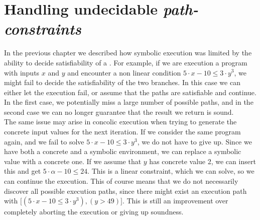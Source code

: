 \section{Handling undecidable \emph{path-constraints}} 
In the previous chapter we described how symbolic execution was limited by the ability to decide satisfiability of a \pc. For example, if we are execution a program with inputs $x$ and $y$ and encounter a non linear condition $ 5\cdot x - 10 \leq 3 \cdot y^3$, we might fail to decide the satisfiability of the two branches. In this case we can either let the execution fail, or assume that the paths are satisfiable and continue. In the first case, we potentially miss a large number of possible paths, and in the second case we can no longer guarantee that the result we return is sound.\\
The same issue may arise in concolic execution when trying to generate the concrete input values for the next iteration. If we consider the same program again, and we fail to solve $ 5\cdot x - 10 \leq 3 \cdot y^3$, we do not have to give up. Since we have both a concrete and a symbolic environment, we can replace a symbolic value with a concrete one. If we assume that $y$ has concrete value 2, we can insert this and get $ 5\cdot \alpha - 10 \leq 24$. This is a linear constraint, which we can solve, so we can continue the execution. This of course means that we do not necessarily discover all possible execution paths, since there might exist an execution path with \pc $\lbrack (5\cdot x - 10 \leq 3 \cdot y^3), (y > 49) \rbrack$. This is still an improvement over completely aborting the execution or giving up soundness. 
